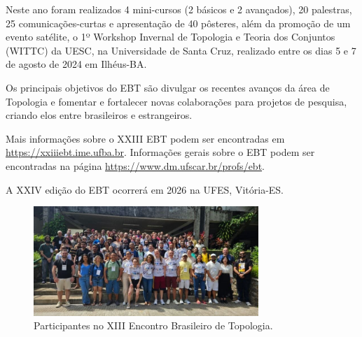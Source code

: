 \documentclass{hipatia}
\begin{document}
Neste ano foram realizados 4 mini-cursos (2 básicos e 2 avançados), 20 palestras, 25 comunicações-curtas e apresentação de 40 pôsteres, além da promoção de um evento satélite, o 1º Workshop Invernal de Topologia e Teoria dos Conjuntos (WITTC) da UESC, na Universidade de Santa Cruz, realizado entre os dias 5 e 7 de agosto de 2024 em Ilhéus-BA.

Os principais objetivos do EBT são divulgar os recentes avanços da área de Topologia e fomentar e fortalecer novas colaborações para projetos de pesquisa, criando elos entre brasileiros e estrangeiros.

Mais informações sobre o XXIII EBT podem ser encontradas em \href{https://xxiiiebt.ime.ufba.br}{https://xxiiiebt.ime.ufba.br}.
Informações gerais sobre o EBT podem ser encontradas na página  \href{https://www.dm.ufscar.br/profs/ebt/about.php}{https://www.dm.ufscar.br/profs/ebt}.

A XXIV edição do EBT ocorrerá em 2026 na UFES, Vitória-ES.

\begin{figure}[htb]
    \centering
    \includegraphics[width=8.5cm]{EBT.jpeg}
    \caption{Participantes no XIII Encontro Brasileiro de Topologia.}
 \label{EBT}
\end{figure}

\end{document}
